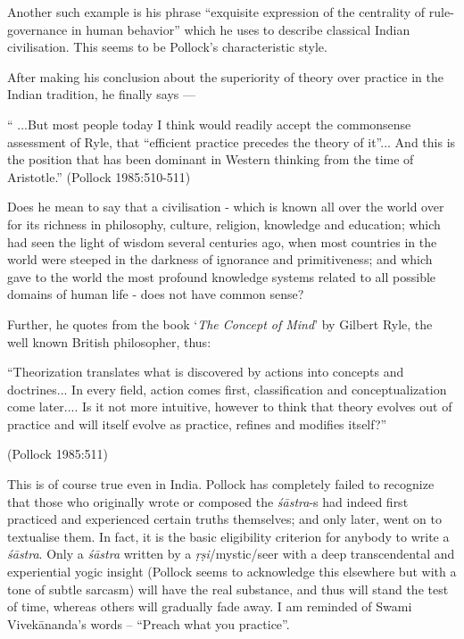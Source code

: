 Another such example is his phrase ``exquisite expression of the centrality of rule-governance in human behavior'' which he uses to describe classical Indian civilisation. This seems to be Pollock's characteristic style. 

After making his conclusion about the superiority of theory over practice in the Indian tradition, he finally says ---
\begin{myquote}
`` ...But most people today I think would readily accept the commonsense assessment of Ryle, that ``efficient practice precedes the theory of it''... And this is the position that has been dominant in Western thinking from the time of Aristotle.''  \hfill (Pollock 1985:510-511)
\end{myquote}

Does he mean to say that a civilisation - which is known all over the world over for its richness in philosophy, culture, religion, knowledge and education; which had seen the light of wisdom several centuries ago, when most countries in the world were steeped in the darkness of ignorance and primitiveness; and which gave to the world the most profound knowledge systems related to all possible domains of human life - does not have common sense?

Further, he quotes from the book `\textsl{The Concept of Mind}' by Gilbert Ryle, the well known British philosopher, thus: 
\begin{myquote}
``Theorization translates what is discovered by actions into concepts and doctrines... In every field, action comes first, classification and conceptualization come later.... Is it not more intuitive, however to think that theory evolves out of practice and will itself evolve as practice, refines and modifies itself?'' 

\hfill (Pollock 1985:511)
\end{myquote}

This is of course true even in India. Pollock has completely failed to recognize that those who originally wrote or composed the {\it śāstra}-s had indeed first practiced and experienced certain truths themselves; and only later, went on to textualise them. In fact, it is the basic eligibility criterion for anybody to write a {\it śāstra}. Only a {\it śāstra} written by a {\it ṛṣi}/mystic/seer with a deep transcendental and experiential yogic insight (Pollock seems to acknowledge this elsewhere but with a tone of subtle sarcasm) will have the real substance, and thus will stand the test of time, whereas others will gradually fade away. I am reminded of Swami Vivekānanda's  words -- ``Preach what you practice''.

